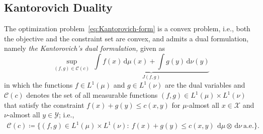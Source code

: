 \documentclass[10pt]{article}
\newcommand{\ud}{\,\mathrm{d}}
\newcommand{\calC}{\mathcal{C}}
\newcommand{\calX}{\mathcal{X}}
\newcommand{\calY}{\mathcal{Y}}
\numberwithin{equation}{section}
\begin{document}
\subsection{Kantorovich Duality}
The optimization problem~\eqref{eq:Kantorovich-form} is a convex problem, i.e., both the objective and the constraint set are convex, and admits a dual formulation, namely {\em the Kantorovich's dual formulation,} given as 
\begin{equation}
\sup_{(f,g)\in\calC(c)}~\underbrace{\int f(x)\ud \mu(x) + \int g(y)\ud \nu(y)}_{J(f,g)}
\label{eq:dual-form}
\end{equation}
in which the functions $f\in L^1(\mu) $ and $g \in L^1(\nu)$ are the dual variables and $\calC(c)$ denotes the set of all measurable functions $(f,g) \in L^1(\mu) \times L^1(\nu)$ that satisfy the constraint $f(x) + g(y) \leq c(x,y)$ for $\mu$-almost all $x \in \calX$ and $\nu$-almost all $y\in \calY$; i.e.,
\begin{align}\label{eq:def-Phic-set}
\calC(c) \coloneqq \bigl\{(f,g)\in L^1(\mu)\times L^1(\nu):~f(x)+g(y)\leq c(x,y)~\ud \mu \otimes \ud \nu~\text{a.e.}\bigr\}.
\end{align}
\end{document}

